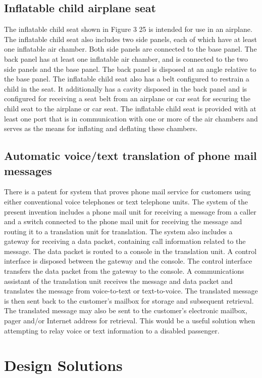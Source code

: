 \subsection{Inflatable child airplane seat}
The inflatable child seat shown in Figure 3 25 is intended for use in an airplane. The inflatable child seat also includes two side panels, each of which have at least one inflatable air chamber. Both side panels are connected to the base panel. The back panel has at least one inflatable air chamber, and is connected to the two side panels and the base panel. The back panel is disposed at an angle relative to the base panel. The inflatable child seat also has a belt configured to restrain a child in the seat. It additionally has a cavity disposed in the back panel and is configured for receiving a seat belt from an airplane or car seat for securing the child seat to the airplane or car seat. The inflatable child seat is provided with at least one port that is in communication with one or more of the air chambers and serves as the means for inflating and deflating these chambers.

\subsection{Automatic voice/text translation of phone mail messages}
There is a patent for system that proves phone mail service for customers using either conventional voice telephones or text telephone units. The system of the present invention includes a phone mail unit for receiving a message from a caller and a switch connected to the phone mail unit for receiving the message and routing it to a translation unit for translation. The system also includes a gateway for receiving a data packet, containing call information related to the message. The data packet is routed to a console in the translation unit. A control interface is disposed between the gateway and the console. The control interface transfers the data packet from the gateway to the console. A communications assistant of the translation unit receives the message and data packet and translates the message from voice-to-text or text-to-voice. The translated message is then sent back to the customer's mailbox for storage and subsequent retrieval. The translated message may also be sent to the customer's electronic mailbox, pager and/or Internet address for retrieval. This would be a useful solution when attempting to relay voice or text information to a disabled passenger.  

\section*{Design Solutions}

